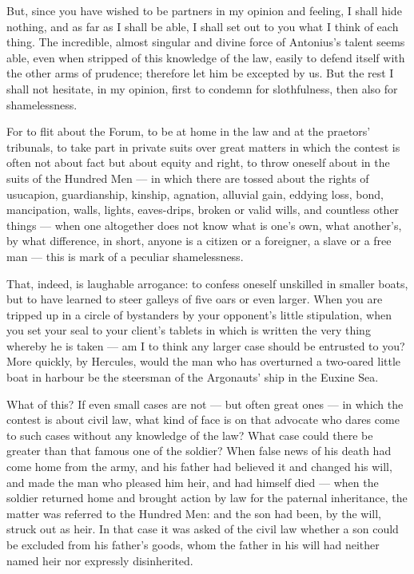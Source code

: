  But, since you have wished to be partners in my opinion and feeling, I shall hide nothing, and as far as I shall be able, I shall set out to you what I think of each thing. The incredible, almost singular and divine force of Antonius's talent seems able, even when stripped of this knowledge of the law, easily to defend itself with the other arms of prudence; therefore let him be excepted by us. But the rest I shall not hesitate, in my opinion, first to condemn for slothfulness, then also for shamelessness.

 For to flit about the Forum, to be at home in the law and at the praetors' tribunals, to take part in private suits over great matters in which the contest is often not about fact but about equity and right, to throw oneself about in the suits of the Hundred Men — in which there are tossed about the rights of usucapion, guardianship, kinship, agnation, alluvial gain, eddying loss, bond, mancipation, walls, lights, eaves-drips, broken or valid wills, and countless other things — when one altogether does not know what is one's own, what another's, by what difference, in short, anyone is a citizen or a foreigner, a slave or a free man — this is mark of a peculiar shamelessness.

 That, indeed, is laughable arrogance: to confess oneself unskilled in smaller boats, but to have learned to steer galleys of five oars or even larger. When you are tripped up in a circle of bystanders by your opponent's little stipulation, when you set your seal to your client's tablets in which is written the very thing whereby he is taken — am I to think any larger case should be entrusted to you? More quickly, by Hercules, would the man who has overturned a two-oared little boat in harbour be the steersman of the Argonauts' ship in the Euxine Sea.

 What of this? If even small cases are not — but often great ones — in which the contest is about civil law, what kind of face is on that advocate who dares come to such cases without any knowledge of the law? What case could there be greater than that famous one of the soldier? When false news of his death had come home from the army, and his father had believed it and changed his will, and made the man who pleased him heir, and had himself died — when the soldier returned home and brought action by law for the paternal inheritance, the matter was referred to the Hundred Men: and the son had been, by the will, struck out as heir. In that case it was asked of the civil law whether a son could be excluded from his father's goods, whom the father in his will had neither named heir nor expressly disinherited.

